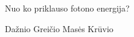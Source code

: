 \question Nuo ko priklauso fotono energija? \begin{choices}
    \choice Dažnio
    \choice Greičio
    \choice Masės
    \choice Krūvio
\end{choices}